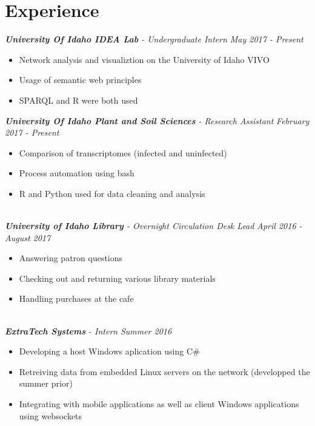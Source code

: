 \documentclass[10pt]{article}
\begin{document}
\section*{Experience}
  \vspace{2mm}
  \textit{\textbf{University Of Idaho IDEA Lab} - Undergraduate Intern} \hfill \textit{May 2017 - Present}
    \begin{adjustwidth}{5mm}{}
  	  \begin{itemize}[noitemsep,nolistsep]
        \item Network analysis and visualiztion on the University of Idaho VIVO
        \item Usage of semantic web principles
        \item SPARQL and R were both used
  	  \end{itemize}
  	\end{adjustwidth}
  \vspace{2mm}
  \textit{\textbf{University Of Idaho Plant and Soil Sciences} - Research Assistant} \hfill \textit{February 2017 - Present}
    \begin{adjustwidth}{5mm}{}
      \begin{itemize}[noitemsep,nolistsep]
        \item Comparison of transcriptomes (infected and uninfected)
        \item Process automation using bash
        \item R and Python used for data cleaning and analysis
  	  \end{itemize}
    \end{adjustwidth}
  \vspace{2mm}
  \noindent
  \\ \textit{\textbf{University of Idaho Library} - Overnight Circulation Desk Lead} \hfill \textit{April 2016 - August 2017}   
    \begin{adjustwidth}{5mm}{}
      \begin{itemize}[noitemsep,nolistsep]
        \item Answering patron questions
        \item Checking out and returning various library materials
        \item Handling purchases at the cafe
  	  \end{itemize}
    \end{adjustwidth}
  \noindent
  \\ \textit{\textbf{ExtraTech Systems} - Intern} \hfill \textit{Summer 2016}
    \begin{adjustwidth}{5mm}{}
      \begin{itemize}[noitemsep,nolistsep]
        \item Developing a host Windows aplication using C\#
        \item Retreiving data from embedded Linux servers on the network (developped the summer prior)
        \item Integrating with mobile applications as well as client Windows applications using websockets
     \end{itemize}
    \end{adjustwidth}
\end{document}
